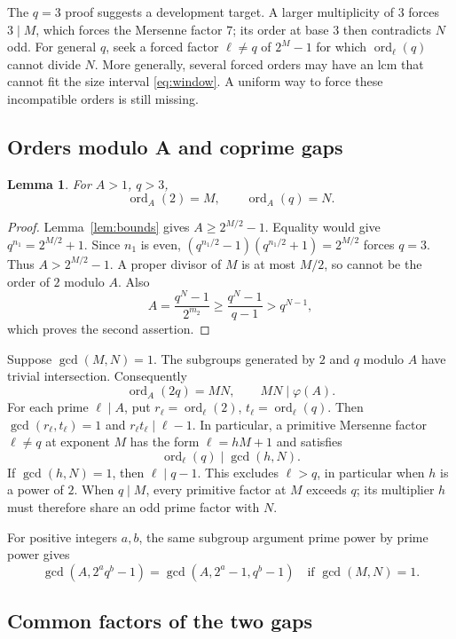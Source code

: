 \documentclass[11pt]{article}
\newtheorem{lemma}{Lemma}
\begin{document}
The $q=3$ proof suggests a development target. A larger multiplicity of
$3$ forces $3\mid M$, which forces the Mersenne factor $7$; its order at
base $3$ then contradicts $N$ odd. For general $q$, seek a forced factor
$\ell\neq q$ of $2^M-1$ for which $\operatorname{ord}_\ell(q)$ cannot
divide $N$. More generally, several forced orders may have an lcm that
cannot fit the size interval \eqref{eq:window}. A uniform way to force
these incompatible orders is still missing.

\subsection{Orders modulo A and coprime gaps}
\label{sec:exact-orders}
\begin{lemma}
For $A>1$, $q>3$,
\[
\operatorname{ord}_A(2)=M,\qquad \operatorname{ord}_A(q)=N.
\]
\end{lemma}
\begin{proof}
Lemma~\ref{lem:bounds} gives $A\geq2^{M/2}-1$.
Equality would give $q^{n_1}=2^{M/2}+1$. Since $n_1$ is even,
$(q^{n_1/2}-1)(q^{n_1/2}+1)=2^{M/2}$ forces $q=3$.
Thus $A>2^{M/2}-1$. A proper divisor of $M$ is at most $M/2$,
so cannot be the order of $2$ modulo $A$.
Also
\[
A=\frac{q^N-1}{2^{m_2}}\geq\frac{q^N-1}{q-1}>q^{N-1},
\]
which proves the second assertion.
\end{proof}

Suppose $\gcd(M,N)=1$. The subgroups generated by $2$ and $q$
modulo $A$ have trivial intersection. Consequently
\[
\operatorname{ord}_A(2q)=MN,\qquad MN\mid\varphi(A).
\]
For each prime $\ell\mid A$, put
$r_\ell=\operatorname{ord}_\ell(2)$, $t_\ell=\operatorname{ord}_\ell(q)$.
Then $\gcd(r_\ell,t_\ell)=1$ and $r_\ell t_\ell\mid\ell-1$.
In particular, a primitive Mersenne factor $\ell\neq q$ at exponent $M$
has the form $\ell=hM+1$ and satisfies
\[
\boxed{\operatorname{ord}_\ell(q)\mid\gcd(h,N).}
\]
If $\gcd(h,N)=1$, then $\ell\mid q-1$. This excludes $\ell>q$,
in particular when $h$ is a power of $2$.
When $q\mid M$, every primitive factor at $M$ exceeds $q$;
its multiplier $h$ must therefore share an odd prime factor with $N$.

For positive integers $a,b$, the same subgroup argument prime power
by prime power gives
\[
\gcd(A,2^a q^b-1)=\gcd(A,2^a-1,q^b-1)
\quad\text{if }\gcd(M,N)=1.
\]

\subsection{Common factors of the two gaps}
\end{document}
